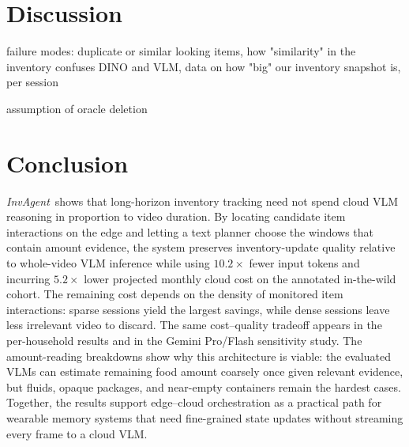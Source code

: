 \documentclass[sigconf,anonymous,nonacm]{acmart}
\newcommand{\sys}{\textit{InvAgent}\xspace}
\begin{document}


\section{Discussion}
failure modes: 
duplicate or similar looking items, how "similarity" in the inventory confuses DINO and VLM, data on how "big" our inventory snapshot is, per session

assumption of oracle deletion

\section{Conclusion}
\sys\ shows that long-horizon inventory tracking need not spend cloud
VLM reasoning in proportion to video duration. By locating candidate
item interactions on the edge and letting a text planner choose the
windows that contain amount evidence, the system preserves inventory-update
quality relative to whole-video VLM inference while using
$10.2\times$ fewer input tokens and incurring $5.2\times$ lower
projected monthly cloud cost on the annotated in-the-wild cohort. The remaining
cost depends on the density of monitored item interactions: sparse
sessions yield the largest savings, while dense sessions leave less
irrelevant video to discard. The same cost--quality tradeoff appears
in the per-household results and in the Gemini Pro/Flash sensitivity
study. The amount-reading breakdowns show why this
architecture is viable: the evaluated VLMs can estimate remaining food amount
coarsely once given relevant evidence, but fluids, opaque packages, and
near-empty containers remain the hardest cases. Together, the results support
edge--cloud orchestration as a practical path for wearable memory
systems that need fine-grained state updates without streaming every
frame to a cloud VLM.



\end{document}
